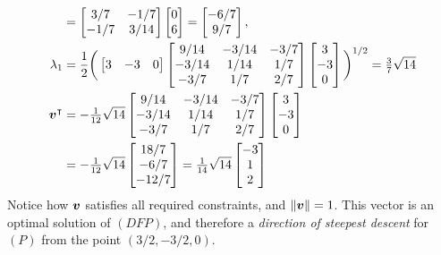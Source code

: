 \begin{example}
\begin{align*}
&= \begin{bmatrix} 3/7 & -1/7 \\ -1/7 & 3/14 \end{bmatrix} \begin{bmatrix} 0 \\ 6 \end{bmatrix} = \begin{bmatrix} -6/7 \\ 9/7 \end{bmatrix}, \\
\lambda_1 &= \frac{1}{2} \bigg( \begin{bmatrix} 3 & -3 & 0 \end{bmatrix} \begin{bmatrix} 9/14 & -3/14 & -3/7 \\ -3/14 & 1/14 & 1/7 \\ -3/7 & 1/7 & 2/7 \end{bmatrix} \begin{bmatrix} 3 \\ -3 \\ 0 \end{bmatrix} \bigg)^{1/2} = \tfrac{3}{7}\sqrt{14} \\
{\boldsymbol{v}}^\intercal &= -\tfrac{1}{12} \sqrt{14} \begin{bmatrix} 9/14 & -3/14 & -3/7 \\ -3/14 & 1/14 & 1/7 \\ -3/7 & 1/7 & 2/7 \end{bmatrix} \begin{bmatrix} 3 \\ -3 \\ 0 \end{bmatrix} \\
&= -\tfrac{1}{12}\sqrt{14} \begin{bmatrix} 18/7 \\ -6/7 \\ -12/7 \end{bmatrix} = \tfrac{1}{14}\sqrt{14} \begin{bmatrix} -3 \\ 1 \\ 2  \end{bmatrix}
\end{align*}
Notice how $\boldsymbol{v}$ satisfies all required constraints, and $\lVert \boldsymbol{v} \rVert=1$.  This vector is an optimal solution of $(DFP)$, and therefore a \emph{direction of steepest descent} for $(P)$ from the point $(3/2, -3/2, 0)$.
\end{example}
